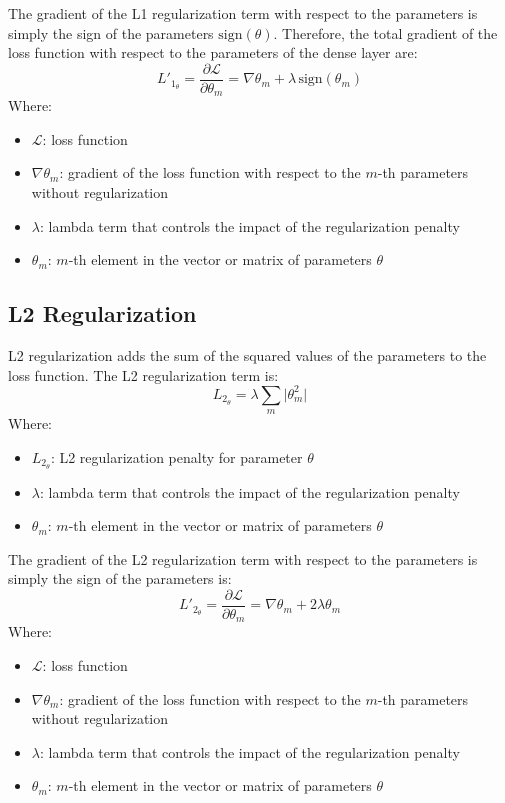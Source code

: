 \documentclass[a4paper]{article}
\newcommand{\abs}[1]{\lvert#1\rvert}
\newcommand{\ELL}{\mathcal{L}}
\begin{document}
The gradient of the L1 regularization term with respect to the parameters is simply the sign of the parameters $\text{sign}(\theta)$. Therefore, the total gradient of the loss function with respect to the parameters of the dense layer are:
\begin{equation*}
    L'_{1_\theta} = \frac{\partial\ELL}{\partial \theta_m} = \nabla\theta_m + \lambda\,\text{sign}(\theta_m)
\end{equation*}
Where:
\begin{itemize}
    \item $\ELL$: loss function
    \item $\nabla\theta_m$: gradient of the loss function with respect to the $m$-th parameters without regularization
    \item $\lambda$: lambda term that controls the impact of the regularization penalty
    \item $\theta_m$: $m$-th element in the vector or matrix of parameters $\theta$
\end{itemize}

\subsection*{L2 Regularization}
L2 regularization adds the sum of the squared values of the parameters to the loss function. The L2 regularization term is:
\begin{equation*}
    L_{2_\theta} = \lambda \sum_m \abs{\theta_m^2}
\end{equation*}
Where:
\begin{itemize}
    \item $L_{2_\theta}$: L2 regularization penalty for parameter $\theta$
    \item $\lambda$: lambda term that controls the impact of the regularization penalty
    \item $\theta_m$: $m$-th element in the vector or matrix of parameters $\theta$
\end{itemize}

The gradient of the L2 regularization term with respect to the parameters is simply the sign of the parameters is: 
\begin{equation*}
    L'_{2_\theta} = \frac{\partial\ELL}{\partial \theta_m} = \nabla\theta_m + 2\lambda\theta_m
\end{equation*}
Where:
\begin{itemize}
    \item $\ELL$: loss function
    \item $\nabla\theta_m$: gradient of the loss function with respect to the $m$-th parameters without regularization
    \item $\lambda$: lambda term that controls the impact of the regularization penalty
    \item $\theta_m$: $m$-th element in the vector or matrix of parameters $\theta$
\end{itemize}
\end{document}
